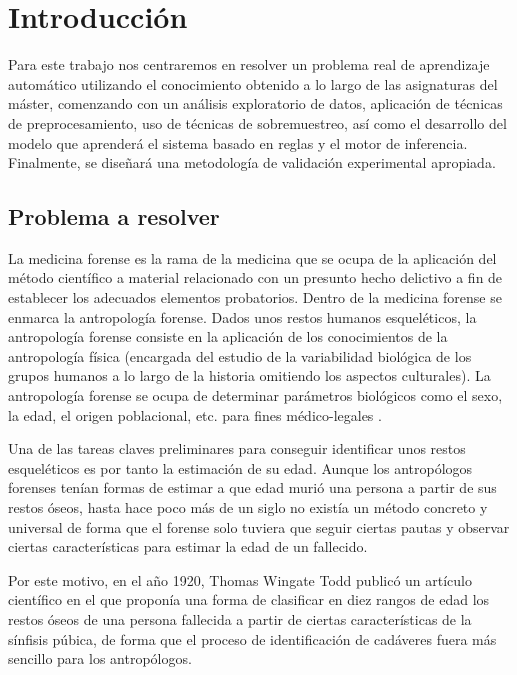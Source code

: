 \section{Introducción} \label{introduccion}



Para este trabajo nos centraremos en resolver un problema real de aprendizaje automático utilizando el conocimiento obtenido a lo largo de las asignaturas del máster, comenzando con un análisis exploratorio de datos, aplicación de técnicas de preprocesamiento, uso de técnicas de sobremuestreo, así como el desarrollo del modelo que aprenderá el sistema basado en reglas y el motor de inferencia. Finalmente, se diseñará una metodología de validación experimental apropiada.

\subsection{Problema a resolver}


La medicina forense es la rama de la medicina que se ocupa de la aplicación del método científico a material relacionado con un presunto hecho delictivo a fin de establecer los adecuados elementos probatorios. Dentro de la medicina forense se enmarca la antropología forense. Dados unos restos humanos esqueléticos, la antropología forense consiste en la aplicación de los conocimientos de la antropología física (encargada del estudio de la variabilidad biológica de los grupos humanos a lo largo de la historia omitiendo los aspectos culturales). La antropología forense se ocupa de determinar parámetros biológicos como el sexo, la edad, el origen poblacional, etc. para fines médico-legales \cite{introduccionAntropologiaForense}.

Una de las tareas claves preliminares para conseguir identificar unos restos esqueléticos es por tanto la estimación de su edad. Aunque los antropólogos forenses tenían formas de estimar a que edad murió una persona a partir de sus restos óseos, hasta hace poco más de un siglo no existía un método concreto y universal de forma que el forense solo tuviera que seguir ciertas pautas y observar ciertas características para estimar la edad de un fallecido.

Por este motivo, en el año 1920, Thomas Wingate Todd publicó un artículo científico \cite{todd} en el que proponía una forma de clasificar en diez rangos de edad los restos óseos de una persona fallecida a partir de ciertas características de la sínfisis púbica, de forma que el proceso de identificación de cadáveres fuera más sencillo para los antropólogos.

